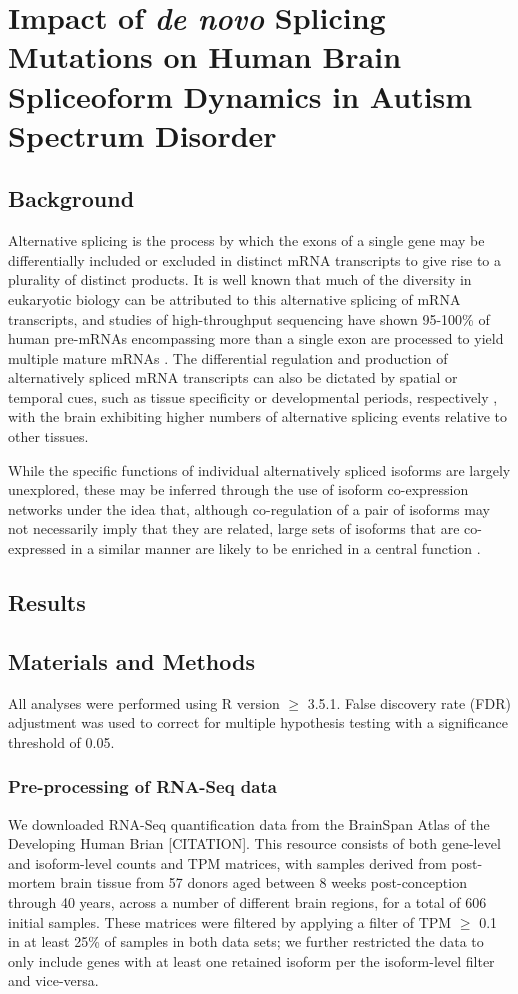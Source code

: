\chapter{Impact of \textit{de novo} Splicing Mutations on Human Brain Spliceoform Dynamics in Autism Spectrum Disorder}
\section{Background}
Alternative splicing is the process by which the exons of a single gene may be differentially included or excluded in distinct mRNA transcripts to give rise to a plurality of distinct products. It is well known that much of the diversity in eukaryotic biology can be attributed to this alternative splicing of mRNA transcripts, and studies of high-throughput sequencing have shown 95-100\% of human pre-mRNAs encompassing more than a single exon are processed to yield multiple mature mRNAs \cite{Pan2008, Wang2008}. The differential regulation and production of alternatively spliced mRNA transcripts can also be dictated by spatial or temporal cues, such as tissue specificity or developmental periods, respectively \cite{Nilsen2010, Porter2018}, with the brain exhibiting higher numbers of alternative splicing events relative to other tissues\cite{Pan2008, Yeo2004, Xu2002}.\par
While the specific functions of individual alternatively spliced isoforms are largely unexplored, these may be inferred through the use of isoform co-expression networks under the idea that, although co-regulation of a pair of isoforms may not necessarily imply that they are related, large sets of isoforms that are co-expressed in a similar manner are likely to be enriched in a central function \cite{Carter2004, Stuart2003}. 
\section{Results}
\section{Materials and Methods}
All analyses were performed using R version $\geq$ 3.5.1. False discovery rate (FDR) adjustment was used to correct for multiple hypothesis testing with a significance threshold of 0.05.
\subsection{Pre-processing of RNA-Seq data}
We downloaded RNA-Seq quantification data from the BrainSpan Atlas of the Developing Human Brian [CITATION]. This resource consists of both gene-level and isoform-level counts and TPM matrices, with samples derived from post-mortem brain tissue from 57 donors aged between 8 weeks post-conception through 40 years, across a number of different brain regions, for a total of 606 initial samples. These matrices were filtered by applying a filter of TPM $\geq$ 0.1 in at least 25\% of samples in both data sets; we further restricted the data to only include genes with at least one retained isoform per the isoform-level filter and vice-versa.
